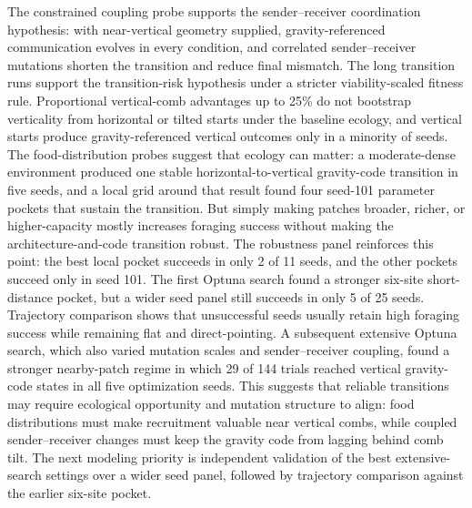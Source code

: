\documentclass[11pt]{article}
\begin{document}
The constrained coupling probe supports the sender--receiver coordination
hypothesis: with near-vertical geometry supplied, gravity-referenced
communication evolves in every condition, and correlated sender--receiver
mutations shorten the transition and reduce final mismatch. The long transition
runs support the transition-risk hypothesis under a stricter viability-scaled
fitness rule. Proportional vertical-comb advantages up to 25\% do not bootstrap
verticality from horizontal or tilted starts under the baseline ecology, and
vertical starts produce gravity-referenced vertical outcomes only in a minority
of seeds. The food-distribution probes suggest that ecology can matter: a
moderate-dense environment produced one stable horizontal-to-vertical
gravity-code transition in five seeds, and a local grid around that result
found four seed-101 parameter pockets that sustain the transition. But simply
making patches broader, richer, or higher-capacity mostly increases foraging
success without making the architecture-and-code transition robust. The
robustness panel reinforces this point: the best local pocket succeeds in only
2 of 11 seeds, and the other pockets succeed only in seed 101. The first Optuna
search found a stronger six-site short-distance pocket, but a wider seed panel
still succeeds in only 5 of 25 seeds. Trajectory comparison shows that
unsuccessful seeds usually retain high foraging success while remaining flat
and direct-pointing. A subsequent extensive Optuna search, which also varied
mutation scales and sender--receiver coupling, found a stronger nearby-patch
regime in which 29 of 144 trials reached vertical gravity-code states in all
five optimization seeds. This suggests that reliable transitions may require
ecological opportunity and mutation structure to align: food distributions must
make recruitment valuable near vertical combs, while coupled sender--receiver
changes must keep the gravity code from lagging behind comb tilt. The next
modeling priority is independent validation of the best extensive-search
settings over a wider seed panel, followed by trajectory comparison against the
earlier six-site pocket.



\end{document}
